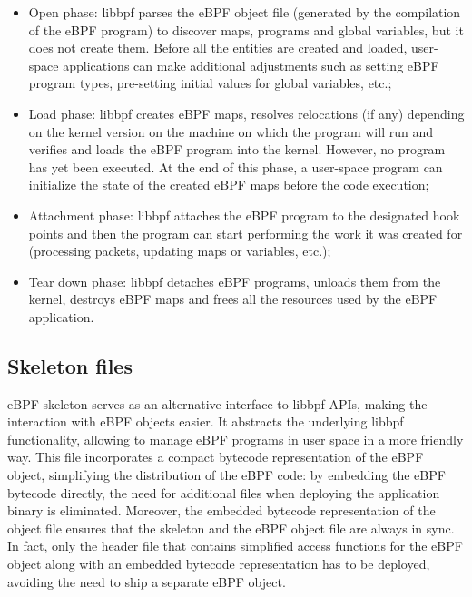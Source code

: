 \begin{itemize}
	\item 
		Open phase: libbpf parses the eBPF object file (generated by the compilation of the eBPF program) to discover maps, programs and global variables, but it does not create them.
		Before all the entities are created and loaded, user-space applications can make additional adjustments such as setting eBPF program types, pre-setting initial values for global variables, etc.;
	\item 
		Load phase: libbpf creates eBPF maps, resolves relocations (if any) depending on the kernel version on the machine on which the program will run and verifies and loads the eBPF program into the kernel.
		However, no program has yet been executed.
		At the end of this phase, a user-space program can initialize the state of the created eBPF maps before the code execution;
	\item 
		Attachment phase: libbpf attaches the eBPF program to the designated hook points and then the program can start performing the work it was created for (processing packets, updating maps or variables, etc.);
	\item 
		Tear down phase: libbpf detaches eBPF programs, unloads them from the kernel, destroys eBPF maps and frees all the resources used by the eBPF application.
\end{itemize}

\subsection{Skeleton files}

eBPF skeleton serves as an alternative interface to libbpf APIs, making the interaction with eBPF objects easier. 
It abstracts the underlying libbpf functionality, allowing to manage eBPF programs in user space in a more friendly way. 
This file incorporates a compact bytecode representation of the eBPF object, simplifying the distribution of the eBPF code: by embedding the eBPF bytecode directly, the need for additional files when deploying the application binary is eliminated.
Moreover, the embedded bytecode representation of the object file ensures that the skeleton and the eBPF object file are always in sync.
In fact, only the header file that contains simplified access functions for the eBPF object along with an embedded bytecode representation has to be deployed, avoiding the need to ship a separate eBPF object.

